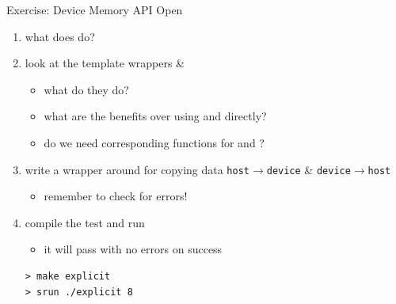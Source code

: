 \documentclass[aspectratio=43]{beamer}
\begin{document}
\begin{frame}[fragile]{Exercise: Device Memory API}
    Open 
    \begin{enumerate}
        \item what does  do?
        \item look at the template wrappers  \& 
        \begin{itemize}
            \item what do they do?
            \item what are the benefits over using  and  directly?
            \item do we need corresponding functions for  and ?
        \end{itemize}

        \item write a wrapper around  for copying data \texttt{host$\rightarrow$device} \& \texttt{device$\rightarrow$host}
        \begin{itemize}
            \item remember to check for errors!
        \end{itemize}

        \item compile the test and run
        \begin{itemize}
            \item it will pass with no errors on success
        \end{itemize}

    \vspace{-5pt}
\begin{terminal}{}
\begin{lstlisting}[style=terminal]
> make explicit
> srun ./explicit 8
\end{lstlisting}
\end{terminal}
    \end{enumerate}

\end{frame}
\end{document}
